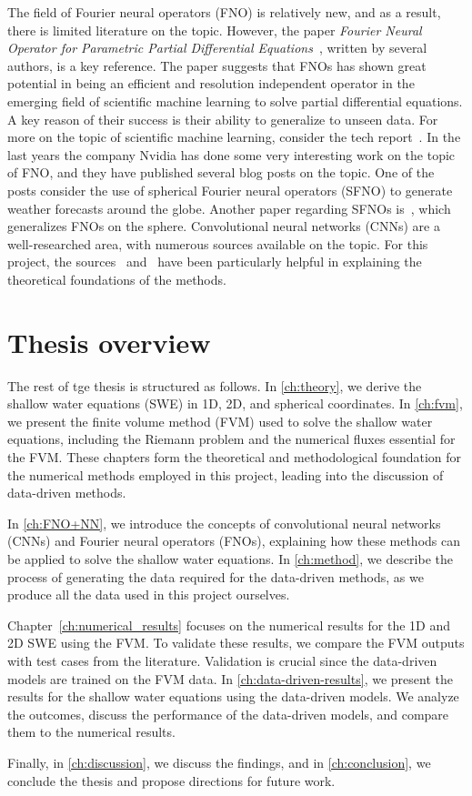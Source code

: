 The field of Fourier neural operators (FNO) is relatively new, and as a result, there is limited literature on the topic.
However, the paper \textit{Fourier Neural Operator for Parametric Partial Differential Equations}~\cite{FNO_2021}, written by several authors, is a key reference.
The paper suggests that FNOs has shown great potential in being an efficient and resolution independent operator in the emerging field of scientific machine learning to solve partial differential equations.
A key reason of their success is their ability to generalize to unseen data.
For more on the topic of scientific machine learning, consider the tech report~\cite{osti_1478744}.
In the last years the company Nvidia has done some very interesting work on the topic of FNO, and they have published several blog posts on the topic.
One of the posts consider the use of spherical Fourier neural operators (SFNO) to generate weather forecasts around the globe\cite{Nvidia2023}.
Another paper regarding SFNOs is~\cite{bonev2023-SFNO}, which generalizes FNOs on the sphere.
Convolutional neural networks (CNNs) are a well-researched area, with numerous sources available on the topic.
For this project, the sources~\cite{oshea2015introductionconvolutionalneuralnetworks} and~\cite{chollet2017comprehensive} have been particularly helpful in explaining the theoretical foundations of the methods.

\section{Thesis overview}
The rest of tge thesis is structured as follows.
In \autoref{ch:theory}, we derive the shallow water equations (SWE) in 1D, 2D, and spherical coordinates.
In \autoref{ch:fvm}, we present the finite volume method (FVM) used to solve the shallow water equations, including the Riemann problem and the numerical fluxes essential for the FVM.
These chapters form the theoretical and methodological foundation for the numerical methods employed in this project, leading into the discussion of data-driven methods.

In \autoref{ch:FNO+NN}, we introduce the concepts of convolutional neural networks (CNNs) and Fourier neural operators (FNOs), explaining how these methods can be applied to solve the shallow water equations.
In \autoref{ch:method}, we describe the process of generating the data required for the data-driven methods, as we produce all the data used in this project ourselves.

Chapter~\ref{ch:numerical_results} focuses on the numerical results for the 1D and 2D SWE using the FVM.
To validate these results, we compare the FVM outputs with test cases from the literature. Validation is crucial since the data-driven models are trained on the FVM data.
In \autoref{ch:data-driven-results}, we present the results for the shallow water equations using the data-driven models.
We analyze the outcomes, discuss the performance of the data-driven models, and compare them to the numerical results.

Finally, in \autoref{ch:discussion}, we discuss the findings, and in \autoref{ch:conclusion}, we conclude the thesis and propose directions for future work.


